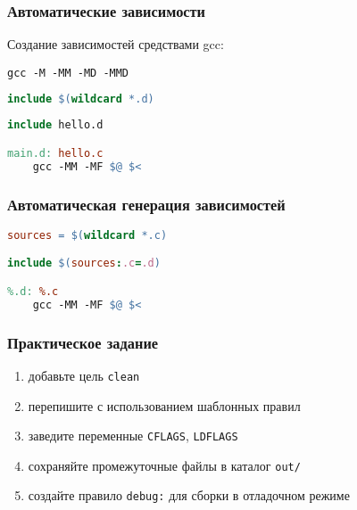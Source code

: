 \begin{frame}[fragile]
	\frametitle{Автоматические зависимости}

	Создание зависимостей средствами gcc:

	\begin{verbatim}
gcc -M -MM -MD -MMD
	\end{verbatim}

	\begin{lstlisting}[language=make]
include $(wildcard *.d)
	\end{lstlisting}

	\begin{lstlisting}[language=make]
include hello.d

main.d: hello.c
	gcc -MM -MF $@ $<
	\end{lstlisting}

\end{frame}

\begin{frame}[fragile]
	\frametitle{Автоматическая генерация зависимостей}

	\begin{lstlisting}[language=make]
sources = $(wildcard *.c)

include $(sources:.c=.d)

%.d: %.c
	gcc -MM -MF $@ $<
	\end{lstlisting}

\end{frame}

\begin{frame}[fragile]
	\frametitle{Практическое задание}

	\begin{enumerate}
		\item добавьте цель {\tt clean}
		\item перепишите с использованием шаблонных правил
		\item заведите переменные {\tt CFLAGS}, {\tt LDFLAGS}
		\item сохраняйте промежуточные файлы в каталог {\tt out/}
		\item создайте правило {\tt debug:} для сборки в отладочном режиме
	\end{enumerate}
\end{frame}

